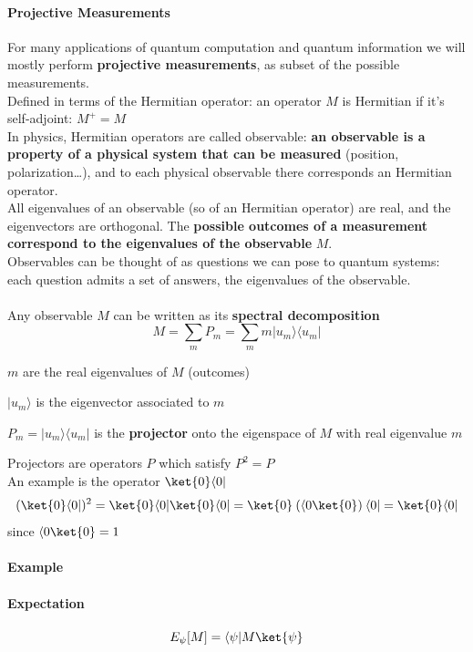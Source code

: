 \documentclass[10pt]{report}
\begin{document}
\paragraph{Projective Measurements} For many applications of quantum computation and quantum information we will mostly perform \textbf{projective measurements}, as subset of the possible measurements.\\
Defined in terms of the Hermitian operator: an operator $M$ is Hermitian if it's self-adjoint: $M^+ = M$\\
In physics, Hermitian operators are called observable: \textbf{an observable is a property of a physical system that can be measured} (position, polarization\ldots), and to each physical observable there corresponds an Hermitian operator.\\
All eigenvalues of an observable (so of an Hermitian operator) are real, and the eigenvectors are orthogonal. The \textbf{possible outcomes of a measurement correspond to the eigenvalues of the observable} $M$.\\
Observables can be thought of as questions we can pose to quantum systems: each question admits a set of answers, the eigenvalues of the observable.\\\\Any observable $M$ can be written as its \textbf{spectral decomposition} $$M = \sum_m P_m = \sum_m m|u_m\rangle\langle u_m|$$
\begin{list}{}{}
	\item $m$ are the real eigenvalues of $M$ (outcomes)
	\item $|u_m\rangle$ is the eigenvector associated to $m$
	\item $P_m = |u_m\rangle\langle u_m|$ is the \textbf{projector} onto the eigenspace of $M$ with real eigenvalue $m$
\end{list}
Projectors are operators $P$ which satisfy $P^2 = P$\\
An example is the operator $\ket{0}\langle0|$ $$(\ket{0}\langle0|)^2 = \ket{0}\langle0|\ket{0}\langle0| = \ket{0}\:(\langle0\ket{0})\:\langle0| = \ket{0}\langle0|$$ since $\langle0\ket{0} = 1$
\paragraph{Example} %
\paragraph{Expectation}
$$E_\psi[M] = \langle\psi|M\ket{\psi}$$
\end{document}
